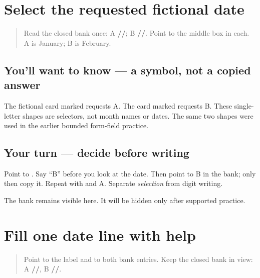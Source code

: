 \section[\texorpdfstring{\pa{ਕ} · \pa{ਖ} (two nonverbal selectors)}{ਕ · ਖ (two nonverbal selectors)}]{Select the requested fictional date}

\label{lesson:PA-W09-date-select}



\begin{quote}
Read the closed bank once: A \textbf{//}; B \textbf{//}. Point to the middle box in each. A is January; B is February.
\end{quote}

\subsection*{You'll want to know — a symbol, not a copied answer}
The fictional card marked \textbf{} requests A. The card marked \textbf{} requests B. These single-letter shapes are selectors, not month names or dates. The same two shapes were used in the earlier bounded form-field practice.

\subsection*{Your turn — decide before writing}
Point to \textbf{}. Say “B” before you look at the date. Then point to B in the bank; only then copy it. Repeat with \textbf{} and A. Separate \emph{selection} from digit writing.

\begin{tcolorbox}[breakable,colback=teal!4,colframe=teal!35!black,title={Before you move on}]
The bank remains visible here. It will be hidden only after supported practice.
\end{tcolorbox}
\section[\texorpdfstring{\pa{ਤਾਰੀਖ਼}: \pa{੧੫}/\pa{੦੧}/\pa{੨੦੨੫} (supported …)}{ਤਾਰੀਖ਼: ੧੫/੦੧/੨੦੨੫ (supported …)}]{Fill one date line with help}

\label{lesson:PA-W09-date-supported}



\begin{quote}
Point to the \textbf{} label and to both bank entries. Keep the closed bank in view: A \textbf{//}, B \textbf{//}.
\end{quote}


